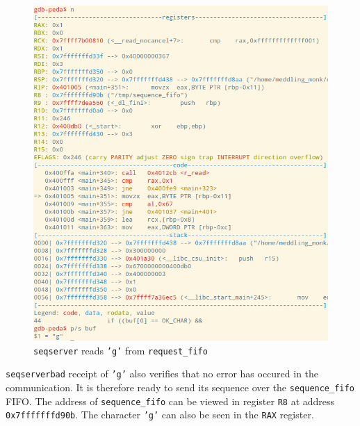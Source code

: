 \documentclass[letter,12pt,sffamily]{article}
\begin{document}
\begin{figure}[H]
	\centering
	\includegraphics[width=1\linewidth]{./images/30}
	\caption[reading_char_from_request_fifo]{\texttt{seqserver} reads \texttt{'g'} from \texttt{request_fifo}}
	\label{fig:32}
\end{figure}
\texttt{seqserverbad} receipt of \texttt{'g'} also verifies that no error has occured in the communication. It is therefore ready 
to send its sequence over the \texttt{sequence_fifo} FIFO. The address of \texttt{sequence_fifo} can be viewed in register \texttt{R8}
at address \texttt{0x7fffffffd90b}. The character \texttt{'g'} can also be seen in the \texttt{RAX} register.
\end{document}
